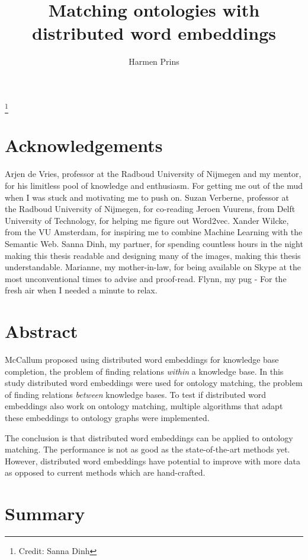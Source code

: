 \documentclass{article}
\title{Matching ontologies with distributed word embeddings}
\author{Harmen Prins}
\begin{document}
 \maketitle
 
 \footnote{Credit: Sanna Dinh}
 \newpage
 
 \section*{Acknowledgements}
 Arjen de Vries, professor at the Radboud University of Nijmegen and my mentor, for his limitless pool of knowledge and enthusiasm. For getting me out of the mud when I was stuck and motivating me to push on. Suzan Verberne, professor at the Radboud University of Nijmegen, for co-reading 
 Jeroen Vuurens, from Delft University of Technology, for helping me figure out Word2vec.
 Xander Wilcke, from the VU Amsterdam, for inspiring me to combine Machine Learning with the Semantic Web.
 Sanna Dinh, my partner, for spending countless hours in the night making this thesis readable and designing many of the images, making this thesis understandable.
 Marianne, my mother-in-law, for being available on Skype at the most unconventional times to advise and proof-read. Flynn, my pug - For the fresh air when I needed a minute to relax.
 
 \section*{Abstract}
 McCallum proposed using distributed word embeddings for knowledge base completion, the problem of finding relations \textit{within} a knowledge base. In this study distributed word embeddings were used for ontology matching, the problem of finding relations \textit{between} knowledge bases. To test if distributed word embeddings also work on ontology matching, multiple algorithms that adapt these embeddings to ontology graphs were implemented.
 
 The conclusion is that distributed word embeddings can be applied to ontology matching. The performance is not as good as the state-of-the-art methods yet. However, distributed word embeddings have potential to improve with more data as opposed to current methods which are hand-crafted.
 
 \section*{Summary}
 \tableofcontents
 \newpage
 
\end{document}
